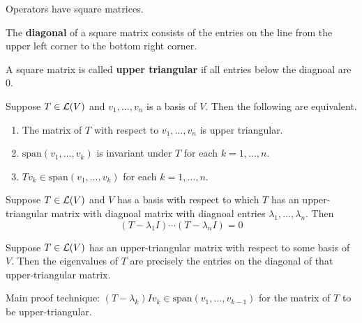 \documentclass{extarticle}
\begin{document}
\begin{remark}
    Operators have square matrices.
\end{remark}

\begin{definition}
    The \textbf{diagonal} of a square matrix consists of the entries on the line from the upper left 
    corner to the bottom right corner. 
\end{definition}

\begin{definition}
    A square matrix is called \textbf{upper triangular} if all entries below the diagnoal are 0.
\end{definition}

\begin{thm}
    Suppose \(T \in \mathcal{L}(V)\) and \(v_1, \ldots, v_n\) is a basis of \(V\). Then the following are 
    equivalent. 
    \begin{enumerate}[label=(\alph*)]
        \item The matrix of \(T\) with respect to \(v_1, \ldots, v_n\) is upper triangular. 
        \item \(\text{span}(v_1, \ldots, v_k)\) is invariant under \(T\) for each \(k = 1, \ldots, n\). 
        \item \(Tv_k \in \text{span}(v_1, \ldots, v_k)\) for each \(k = 1, \ldots, n\). 
    \end{enumerate}
\end{thm}

\begin{lemma}
    Suppose \(T \in \mathcal{L}(V)\) and \(V\) has a basis with respect to which \(T\) has an upper-triangular matrix 
    with diagnoal matrix with diagnoal entries \(\lambda_1, \ldots, \lambda_n\). Then 
    \[(T - \lambda_1 I) \cdots (T - \lambda_n I) = 0\]
\end{lemma}

\begin{thm}
    Suppose \(T \in \mathcal{L}(V)\) has an upper-triangular matrix with respect to some 
    basis of \(V\). Then the eigenvalues of \(T\) are precisely the entries on the diagonal 
    of that upper-triangular matrix. 
\end{thm}

\begin{remark}
    Main proof technique: \((T - \lambda_k)I v_k \in \text{span}(v_1, \ldots, v_{k-1})\) for the matrix 
    of \(T\) to be upper-triangular. 
\end{remark}
\end{document}
